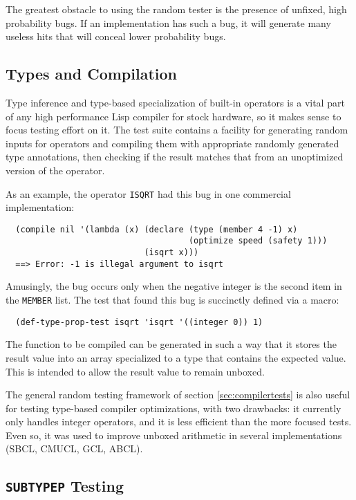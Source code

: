 \documentclass[11pt]{article}
\begin{document}
The greatest obstacle to using the random tester is the presence of
unfixed, high probability bugs.  If an implementation has such a bug,
it will generate many useless hits that will conceal
lower probability bugs.

\subsection {Types and Compilation}

Type inference and type-based specialization of built-in operators is a
vital part of any high performance Lisp compiler for stock hardware,
so it makes sense to focus testing effort on it.  The test suite
contains a facility for generating random inputs for operators and
compiling them with appropriate randomly generated type annotations,
then checking if the result matches that from an unoptimized version
of the operator.

As an example, the operator {\tt ISQRT} had this bug in one commercial
implementation:
\begin{verbatim}
  (compile nil '(lambda (x) (declare (type (member 4 -1) x)
                                     (optimize speed (safety 1)))
                            (isqrt x)))
  ==> Error: -1 is illegal argument to isqrt
\end{verbatim}
Amusingly, the bug occurs only when the negative integer is the second
item in the {\tt MEMBER} list.  The test that found this bug is
succinctly defined via a macro:
\begin{verbatim}
  (def-type-prop-test isqrt 'isqrt '((integer 0)) 1)
\end{verbatim}
The function to be compiled can be generated in such a way that it stores
the result value into an array specialized to a type that contains
the expected value.  This is intended to allow the result value to
remain unboxed.

The general random testing framework of section
\ref{sec:compilertests} is also useful for testing type-based compiler
optimizations, with two drawbacks: it currently only handles integer
operators, and it is less efficient than the more focused tests.
Even so, it was used to improve unboxed arithmetic in several
implementations (SBCL, CMUCL, GCL, ABCL).

\subsection {{\tt SUBTYPEP} Testing}
\end{document}
